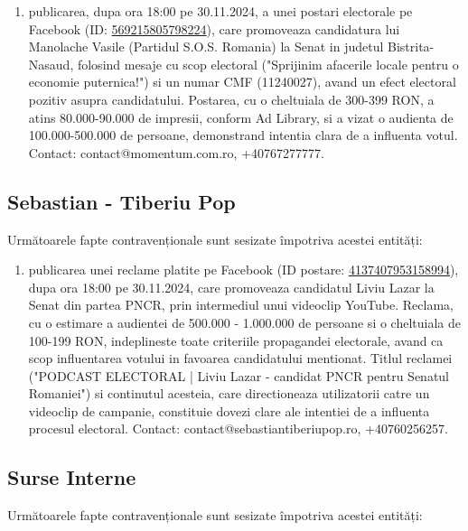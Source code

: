 \documentclass[a4paper,12pt]{article}
\begin{document}
\begin{enumerate}[leftmargin=*, label=\arabic*.)]
    \item publicarea, dupa ora 18:00 pe 30.11.2024, a unei postari electorale pe Facebook (ID: \href{https://www.facebook.com/ads/library/?id=569215805798224}{569215805798224}), care promoveaza candidatura lui Manolache Vasile (Partidul S.O.S. Romania) la Senat in judetul Bistrita-Nasaud, folosind mesaje cu scop electoral ("Sprijinim afacerile locale pentru o economie puternica!") si un numar CMF (11240027),  avand un efect electoral pozitiv asupra candidatului. Postarea, cu o cheltuiala de 300-399 RON, a atins 80.000-90.000 de impresii, conform Ad Library, si a vizat o audienta de 100.000-500.000 de persoane, demonstrand intentia clara de a influenta votul.  Contact: contact@momentum.com.ro, +40767277777.
\end{enumerate}

\vspace{0.5cm}

\subsection{Sebastian - Tiberiu Pop}
Următoarele fapte contravenționale sunt sesizate împotriva acestei entități:

\begin{enumerate}[leftmargin=*, label=\arabic*.)]
    \item publicarea unei reclame platite pe Facebook (ID postare: \href{https://www.facebook.com/ads/library/?id=4137407953158994}{4137407953158994}), dupa ora 18:00 pe 30.11.2024, care promoveaza candidatul Liviu Lazar la Senat din partea PNCR, prin intermediul unui videoclip YouTube. Reclama, cu o estimare a audientei de 500.000 - 1.000.000 de persoane si o cheltuiala de 100-199 RON, indeplineste toate criteriile propagandei electorale, avand ca scop influentarea votului in favoarea candidatului mentionat. Titlul reclamei ("PODCAST ELECTORAL | Liviu Lazar - candidat PNCR pentru Senatul Romaniei") si continutul acesteia, care directioneaza utilizatorii catre un videoclip de campanie, constituie dovezi clare ale intentiei de a influenta procesul electoral.  Contact: contact@sebastiantiberiupop.ro, +40760256257.
\end{enumerate}

\vspace{0.5cm}

\subsection{Surse Interne}
Următoarele fapte contravenționale sunt sesizate împotriva acestei entități:
\end{document}
